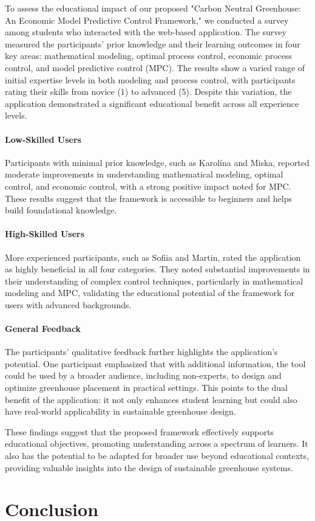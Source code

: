 \documentclass[conference]{IEEEtran}
\begin{document}
To assess the educational impact of our proposed "Carbon Neutral Greenhouse: An Economic Model Predictive Control Framework," we conducted a survey among students who interacted with the web-based application. The survey measured the participants' prior knowledge and their learning outcomes in four key areas: mathematical modeling, optimal process control, economic process control, and model predictive control (MPC).
The results show a varied range of initial expertise levels in both modeling and process control, with participants rating their skills from novice (1) to advanced (5). Despite this variation, the application demonstrated a significant educational benefit across all experience levels.

\paragraph{Low-Skilled Users}
Participants with minimal prior knowledge, such as Karolína and Miska, reported moderate improvements in understanding mathematical modeling, optimal control, and economic control, with a strong positive impact noted for MPC. These results suggest that the framework is accessible to beginners and helps build foundational knowledge.
\paragraph{High-Skilled Users}
More experienced participants, such as Sofiia and Martin, rated the application as highly beneficial in all four categories. They noted substantial improvements in their understanding of complex control techniques, particularly in mathematical modeling and MPC, validating the educational potential of the framework for users with advanced backgrounds.
\paragraph{General Feedback}
 The participants' qualitative feedback further highlights the application's potential. One participant emphasized that with additional information, the tool could be used by a broader audience, including non-experts, to design and optimize greenhouse placement in practical settings. This points to the dual benefit of the application: it not only enhances student learning but could also have real-world applicability in sustainable greenhouse design.

These findings suggest that the proposed framework effectively supports educational objectives, promoting understanding across a spectrum of learners. It also has the potential to be adapted for broader use beyond educational contexts, providing valuable insights into the design of sustainable greenhouse systems.

\section{Conclusion}



\end{document}

